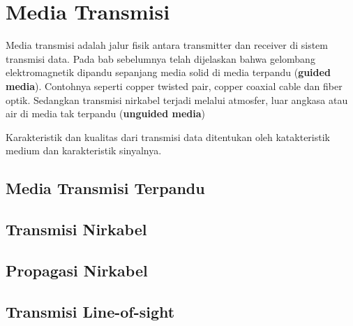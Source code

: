 \chapter{Media Transmisi}

Media transmisi adalah jalur fisik antara transmitter dan receiver di sistem transmisi data. Pada bab sebelumnya telah dijelaskan bahwa gelombang elektromagnetik dipandu sepanjang media solid di media terpandu (\textbf{guided media}). Contohnya seperti copper twisted pair, copper coaxial cable dan fiber optik. Sedangkan transmisi nirkabel terjadi melalui atmosfer, luar angkasa atau air di media tak terpandu (\textbf{unguided media})

Karakteristik dan kualitas dari transmisi data ditentukan oleh katakteristik medium dan karakteristik sinyalnya.

\section{Media Transmisi Terpandu}

\section{Transmisi Nirkabel}

\section{Propagasi Nirkabel}

\section{Transmisi Line-of-sight}

